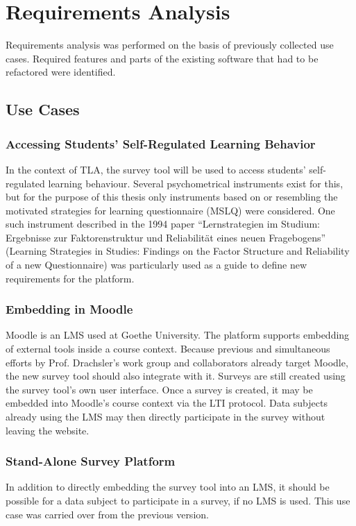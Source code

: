 \section{Requirements Analysis}
\label{section:requirements-analysis}

Requirements analysis was performed on the basis of previously collected use cases.
Required features and parts of the existing software that
had to be refactored were identified.

\subsection{Use Cases}

    \subsubsection{Accessing Students' Self-Regulated Learning Behavior}
    In the context of TLA, the survey tool will be used to access students' self-regulated
    learning behaviour. Several psychometrical instruments exist for this, but
    for the purpose of this thesis only instruments based on or resembling
    the motivated strategies for learning questionnaire (MSLQ) were considered.
    One such instrument described in the 1994 paper 
    ``Lernstrategien im Studium: Ergebnisse zur Faktorenstruktur und Reliabilit\"at eines neuen Fragebogens''
    (Learning Strategies in Studies: Findings on the Factor Structure and Reliability of a new Questionnaire)
     \cite{lernstrategien-wild-schiefele}
    was particularly used as a guide to define new requirements for the platform.
     
     \subsubsection{Embedding in Moodle}
     \label{use-case:embedding}
     Moodle is an LMS used at Goethe University. The platform supports embedding of external
     tools inside a course context. Because previous and simultaneous efforts by Prof. Drachsler's
     work group and collaborators already target Moodle, the new survey tool should also integrate
     with it. Surveys are still created using the survey tool's own user interface.
     Once a survey is created, it may be embedded into Moodle's course context via the LTI
     protocol. Data subjects already using the LMS may then directly participate in
     the survey without leaving the website.
 
     \subsubsection{Stand-Alone Survey Platform}
     In addition to directly embedding the survey tool into an LMS, it should be possible
     for a data subject to participate in a survey, if no LMS is used.
     This use case was carried over from the previous version.

